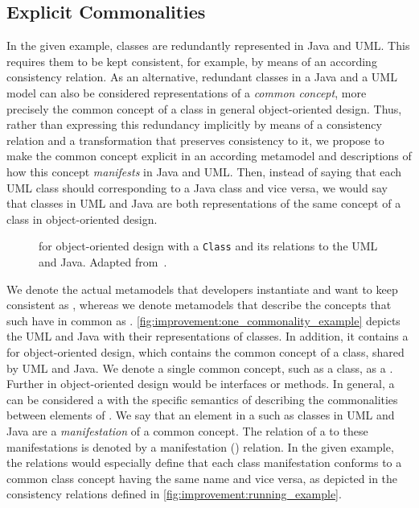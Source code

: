 \subsection{Explicit Commonalities}
\label{chap:improvement:concepts:explicit}

In the given example, classes are redundantly represented in Java and \gls{UML}.
This requires them to be kept consistent, for example, by means of an according consistency relation.
As an alternative, redundant classes in a Java and a \gls{UML} model can also be considered representations of a \emph{common concept}, more precisely the common concept of a class in general object-oriented design.
Thus, rather than expressing this redundancy implicitly by means of a consistency relation and a transformation that preserves consistency to it, we propose to make the common concept explicit in an according metamodel and descriptions of how this concept \emph{manifests} in Java and \gls{UML}.
Then, instead of saying that each \gls{UML} class should corresponding to a Java class and vice versa, we would say that classes in \gls{UML} and Java are both representations of the same concept of a class in object-oriented design.

\begin{figure}
    \centering
    
    \caption[One \commonality example for object-oriented design]{\Conceptmetamodel for object-oriented design with a \texttt{Class} \commonality and its relations to the \concretemetamodels \gls{UML} and Java. Adapted from~.}
    \label{fig:improvement:one_commonality_example}
\end{figure}

We denote the actual metamodels that developers instantiate and want to keep consistent as \emph{\concretemetamodels}, whereas we denote metamodels that describe the concepts that such \concretemetamodels have in common as \emph{\conceptmetamodels}.
\autoref{fig:improvement:one_commonality_example} depicts the \concretemetamodels \gls{UML} and Java with their representations of classes.
In addition, it contains a \conceptmetamodel for object-oriented design, which contains the common concept of a class, shared by \gls{UML} and Java.
We denote a single common concept, such as a class, as a \emph{\commonality}.
Further \commonalities in object-oriented design would be interfaces or methods.
In general, a \commonality can be considered a \metaclass with the specific semantics of describing the commonalities between elements of \concretemetamodels.
We say that an element in a \concretemetamodel such as classes in \gls{UML} and Java are a \emph{manifestation} of a common concept.
The relation of a \commonality to these manifestations is denoted by a manifestation (\emph{\manifestslabel}) relation.
In the given example, the relations would especially define that each class manifestation conforms to a common class concept having the same name and vice versa, as depicted in the consistency relations defined in \autoref{fig:improvement:running_example}.

